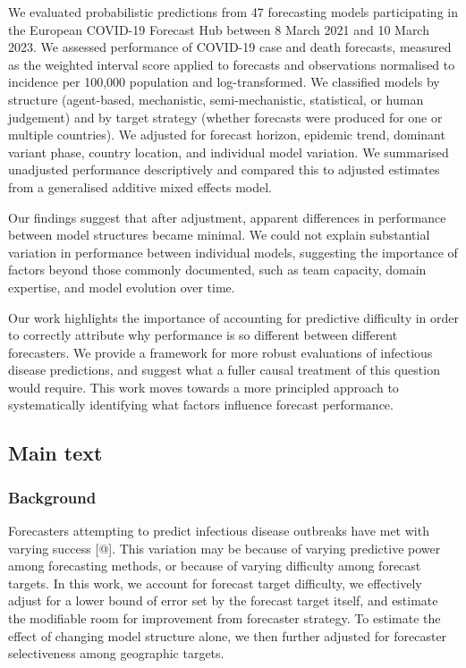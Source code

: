 \documentclass[
  letterpaper,
  DIV=11,
  numbers=noendperiod]{scrartcl}
\begin{document}
We evaluated probabilistic predictions from 47 forecasting models
participating in the European COVID-19 Forecast Hub between 8 March 2021
and 10 March 2023. We assessed performance of COVID-19 case and death
forecasts, measured as the weighted interval score applied to forecasts
and observations normalised to incidence per 100,000 population and
log-transformed. We classified models by structure (agent-based,
mechanistic, semi-mechanistic, statistical, or human judgement) and by
target strategy (whether forecasts were produced for one or multiple
countries). We adjusted for forecast horizon, epidemic trend, dominant
variant phase, country location, and individual model variation. We
summarised unadjusted performance descriptively and compared this to
adjusted estimates from a generalised additive mixed effects model.

Our findings suggest that after adjustment, apparent differences in
performance between model structures became minimal. We could not
explain substantial variation in performance between individual models,
suggesting the importance of factors beyond those commonly documented,
such as team capacity, domain expertise, and model evolution over time.

Our work highlights the importance of accounting for predictive
difficulty in order to correctly attribute why performance is so
different between different forecasters. We provide a framework for more
robust evaluations of infectious disease predictions, and suggest what a
fuller causal treatment of this question would require. This work moves
towards a more principled approach to systematically identifying what
factors influence forecast performance.

\subsection{Main text}\label{main-text}

\subsubsection{Background}\label{background}

Forecasters attempting to predict infectious disease outbreaks have met
with varying success {[}@{]}. This variation may be because of varying
predictive power among forecasting methods, or because of varying
difficulty among forecast targets. In this work, we account for forecast
target difficulty, we effectively adjust for a lower bound of error set
by the forecast target itself, and estimate the modifiable room for
improvement from forecaster strategy. To estimate the effect of changing
model structure alone, we then further adjusted for forecaster
selectiveness among geographic targets.
\end{document}
